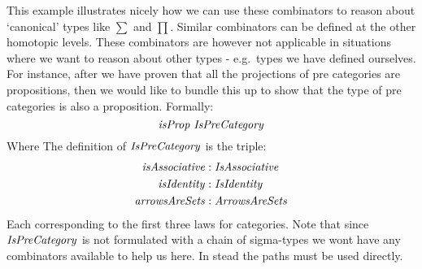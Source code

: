 This example illustrates nicely how we can use these combinators to reason about
`canonical' types like $\sum$ and $\prod$. Similar combinators can be defined at
the other homotopic levels. These combinators are however not applicable in
situations where we want to reason about other types - e.g.\ types we have
defined ourselves. For instance, after we have proven that all the projections
of pre categories are propositions, then we would like to bundle this up to show
that the type of pre categories is also a proposition. Formally:
%
\begin{equation}
\label{eq:propIsPreCategory}
\isProp\ \IsPreCategory
\end{equation}
%
Where The definition of $\IsPreCategory$ is the triple:
%
\begin{align*}
\var{isAssociative} & \tp \var{IsAssociative}\\
\isIdentity    & \tp \var{IsIdentity}\\
\var{arrowsAreSets} & \tp \var{ArrowsAreSets}
\end{align*}
%
Each corresponding to the first three laws for categories. Note that since
$\IsPreCategory$ is not formulated with a chain of sigma-types we wont have any
combinators available to help us here. In stead the paths must be used directly.


